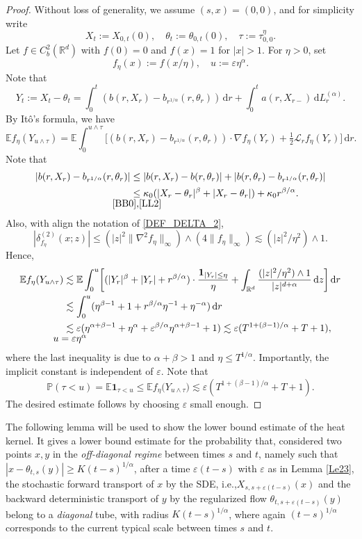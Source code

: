 \documentclass[11pt]{article}
\newcommand{\ie}{i.e.,\xspace}
\numberwithin{equation}{section}\providecommand{\asymp}{\mathrel{\sim}}
\newcommand{\sm}[1]{\makebox[0pt][c]{\scriptsize#1}}
\theoremstyle{plain}
\theoremstyle{definition}
\let\eps\varepsilon
\newcommand\cL{{\mathcal L}}
\newcommand\mE{\mathbb{E}}
\newcommand\mP{\mathbb{P}}
\newcommand\mR{\mathbb{R}}
\newcommand\1{{\mathbf{1}}}
\newcommand{\dif}{\,\mathrm{d}}
\begin{document}
\begin{proof}
Without loss of generality, we assume $(s,x)=(0,0)$, and for simplicity write
\[
X_t:=X_{0,t}(0),\quad \theta_t:=\theta_{0,t}(0),\quad \tau:=\tau^\eta_{0,0}.
\]
Let $f\in C^2_b(\mR^d)$ with $f(0)=0$ and $f(x)=1$ for $|x|>1$. For $\eta>0$, set
\[
f_\eta(x):=f(x/\eta),\quad u:=\eps\eta^\alpha.
\]
Note that
\[
Y_t:=X_t-\theta_t=\int^t_0(b(r,X_r)-b_{r^{1/\alpha}}(r,\theta_r))\dif r+\int^t_0a(r,X_{r-})\dif L^{(\alpha)}_r.
\]
By Itô's formula, we have
\begin{equation*}
\mE f_\eta(Y_{u\wedge\tau})=\mE\int^{u\wedge\tau}_0\!\!\Big[(b(r,X_r)-b_{r^{1/\alpha}}(r,\theta_r))\cdot\nabla f_\eta(Y_r)
+\tfrac12\cL_r f_\eta(Y_r)\Big]\dif r.
\end{equation*}
Note that
\begin{align*}
|b(r,X_r)-b_{r^{1/\alpha}}(r,\theta_r)|
&\leq|b(r,X_r)-b(r,\theta_r)|+|b(r,\theta_r)-b_{r^{1/\alpha}}(r,\theta_r)|
\\&\underset{\sm{\eqref{BB0},\eqref{LL2}}}{\leq}\kappa_0(|X_r-\theta_r|^\beta+|X_r-\theta_r|)+\kappa_0r^{\beta/\alpha}.
\end{align*}
Also, with align the notation of \eqref{DEF_DELTA_2},
\[
|\delta^{(2)}_{f_\eta}(x;z)|\leq (|z|^2\|\nabla^2 f_\eta\|_\infty)\wedge(4\|f_\eta\|_\infty)\lesssim (|z|^2/\eta^2)\wedge 1.
\]
Hence,
\begin{align*}
\mE f_\eta(Y_{u\wedge\tau})&\lesssim\mE\int^{u}_0\biggl[(|Y_r|^\beta+|Y_r|+r^{\beta/\alpha})\cdot\frac{\1_{|Y_r|\leq\eta}}{\eta}
+\int_{\mR^d}\frac{(|z|^2/\eta^2)\wedge 1}{|z|^{d+\alpha}}\dif z\biggr]\dif r
\\&\lesssim\int^{u}_0(\eta^{\beta-1}+1+r^{\beta/\alpha}\eta^{-1}+\eta^{-\alpha})\dif r
\\&\underset{\sm{$u=\eps\eta^\alpha$}}{\lesssim} \eps(\eta^{\alpha+\beta-1}+\eta^\alpha+ \eps^{\beta/\alpha}\eta^{\alpha+\beta-1}+1)
\lesssim \eps( T^{1+(\beta-1)/\alpha}+T+1),
\end{align*}
where the last inequality is due to $\alpha+\beta>1$ and $\eta\leq T^{1/\alpha}$. Importantly, the implicit constant is
independent of $\eps$. Note that
\begin{equation*}
\mP(\tau<u)=\mE\1_{\tau<u}\leq\mE f_{\eta}\bigl(Y_{u\wedge\tau}\bigr)\lesssim \eps(T^{1+(\beta-1)/\alpha}+T+1).
\end{equation*}
The desired estimate follows by choosing $\eps$ small enough.
\end{proof}
The following lemma will be used to show the lower bound estimate of the heat kernel.
It gives a lower bound estimate for the probability that, considered two points $x,y$ in the \textit{off-diagonal regime} between times $s$ and $t$, namely such that $ |x-\theta_{t,s}(y)|\ge K(t-s)^{1/\alpha}$, after a time $\varepsilon (t-s)$ with $\eps $ as in Lemma \ref{Le23}, the stochastic forward transport of $x$ by the SDE, \ie $X_{s,s+\eps(t-s)}(x) $ and the backward deterministic transport of $y$ by the regularized flow $\theta_{t,s+\eps(t-s)}(y) $ belong to a \textit{diagonal} tube, with radius $K(t-s)^{1/\alpha} $,
where again $(t-s)^{1/\alpha} $ corresponds to the current typical scale between times $s$ and $t$.
\end{document}
